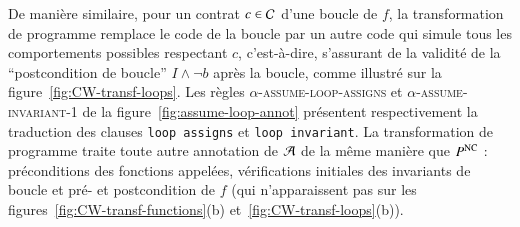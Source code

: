 De manière similaire, pour un contrat $c\in{\ensuremath\mathcal{C}}$ d'une boucle de $f$, la
transformation de programme remplace le code de la boucle par un autre code qui
simule tous les comportements possibles respectant $c$, c'est-à-dire, s'assurant
de la validité de la ``postcondition de boucle'' $I\wedge \neg b$ après la
boucle, comme illustré sur la figure~\ref{fig:CW-transf-loops}.
Les règles \textsc{$\alpha$-assume-loop-assigns} et
\textsc{$\alpha$-assume-invariant-1} de la figure~\ref{fig:assume-loop-annot}
présentent respectivement la traduction des clauses \lstinline'loop assigns' et
\lstinline'loop invariant'.
La transformation de programme traite toute autre annotation de ${\mathcal{A}}$ de la
même manière que $P^{\mathrm{NC}}$ : préconditions des fonctions appelées, vérifications
initiales des invariants de boucle et pré- et postcondition de $f$ (qui
n'apparaissent pas sur les figures~\ref{fig:CW-transf-functions}(b)
et~\ref{fig:CW-transf-loops}(b)).


\begin{figure}[tb]
  \begin{minipage}{0.5\columnwidth}
    
  \end{minipage}
  \begin{minipage}{0.5\columnwidth}
    
  \end{minipage}
\end{figure}


